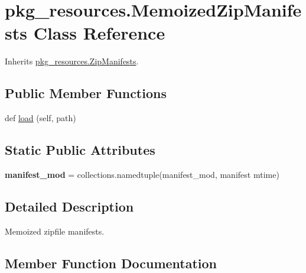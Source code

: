 \hypertarget{classpkg__resources_1_1_memoized_zip_manifests}{}\section{pkg\+\_\+resources.\+Memoized\+Zip\+Manifests Class Reference}
\label{classpkg__resources_1_1_memoized_zip_manifests}


Inherits \hyperlink{classpkg__resources_1_1_zip_manifests}{pkg\+\_\+resources.\+Zip\+Manifests}.

\subsection*{Public Member Functions}
\begin{DoxyCompactItemize}
\item 
def \hyperlink{classpkg__resources_1_1_memoized_zip_manifests_a50bc96483413c076fed78057393f6d3c}{load} (self, path)
\end{DoxyCompactItemize}
\subsection*{Static Public Attributes}
\begin{DoxyCompactItemize}
\item 
\mbox{\label{classpkg__resources_1_1_memoized_zip_manifests_a274e5a889fe7b201cdc04af67c10e708}} 
{\bfseries manifest\+\_\+mod} = collections.\+namedtuple(\textquotesingle{}manifest\+\_\+mod\textquotesingle{}, \textquotesingle{}manifest mtime\textquotesingle{})
\end{DoxyCompactItemize}


\subsection{Detailed Description}
\begin{DoxyVerb}Memoized zipfile manifests.
\end{DoxyVerb}
 

\subsection{Member Function Documentation}
\mbox{\label{classpkg__resources_1_1_memoized_zip_manifests_a50bc96483413c076fed78057393f6d3c}} 

